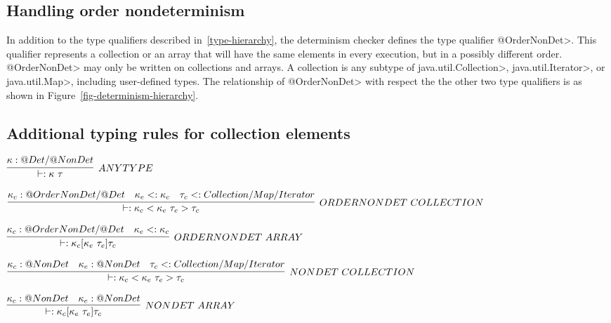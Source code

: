 \subsection{Handling order nondeterminism}
In addition to the type qualifiers described in~\ref{type-hierarchy}, the determinism checker 
defines the type qualifier \<@OrderNonDet>. This qualifier represents
a collection or an array that will have the same elements in every execution, but in a
possibly different order.  \<@OrderNonDet> may only be written on
collections and arrays.
A collection is any subtype of \<java.util.Collection>,
\<java.util.Iterator>, or \<java.util.Map>, including user-defined types. The relationship
of \<@OrderNonDet> with respect the the other two type qualifiers is  as shown in Figure~\ref{fig-determinism-hierarchy}.

\subsection{Additional typing rules for collection elements}\label{collection-rules}

%
%
%

$\infer[ANY TYPE]{\vdash : \kappa \  \tau}{\kappa : @Det / @NonDet}$


$\infer[ORDERNONDET \ COLLECTION]{\vdash : \kappa_c <\kappa_e \ \tau_e> \tau_c}{\kappa_c : @OrderNonDet/@Det & \kappa_e <: \kappa_c & \tau_c <: Collection/Map/Iterator}$

$\infer[ORDERNONDET \ ARRAY]{\vdash : \kappa_c [\kappa_e \ \tau_e] \tau_c}{\kappa_c : @OrderNonDet/@Det & \kappa_e <: \kappa_c }$

$\infer[NONDET \ COLLECTION]{\vdash : \kappa_c <\kappa_e \ \tau_e> \tau_c}{\kappa_c : @NonDet & \kappa_e : @NonDet & \tau_c <: Collection/Map/Iterator}$

$\infer[NONDET \ ARRAY]{\vdash : \kappa_c [\kappa_e \ \tau_e] \tau_c}{\kappa_c : @NonDet & \kappa_e : @NonDet }$

